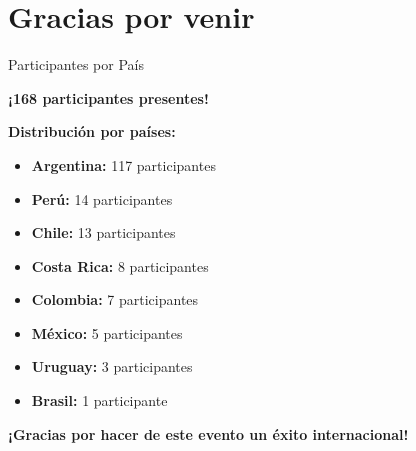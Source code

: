 \documentclass{beamer}
\begin{document}
\section{Gracias por venir}

\begin{frame}{Participantes por País}
\begin{center}
\Large
\textbf{¡168 participantes presentes!}

\vspace{0.5cm}

\normalsize
\textbf{Distribución por países:}

\vspace{0.3cm}

\begin{itemize}
\item \textbf{Argentina:} 117 participantes
\item \textbf{Perú:} 14 participantes  
\item \textbf{Chile:} 13 participantes
\item \textbf{Costa Rica:} 8 participantes
\item \textbf{Colombia:} 7 participantes
\item \textbf{México:} 5 participantes
\item \textbf{Uruguay:} 3 participantes
\item \textbf{Brasil:} 1 participante
\end{itemize}

\vspace{0.5cm}

\textbf{¡Gracias por hacer de este evento un éxito internacional!}
\end{center}
\end{frame}
\end{document}
